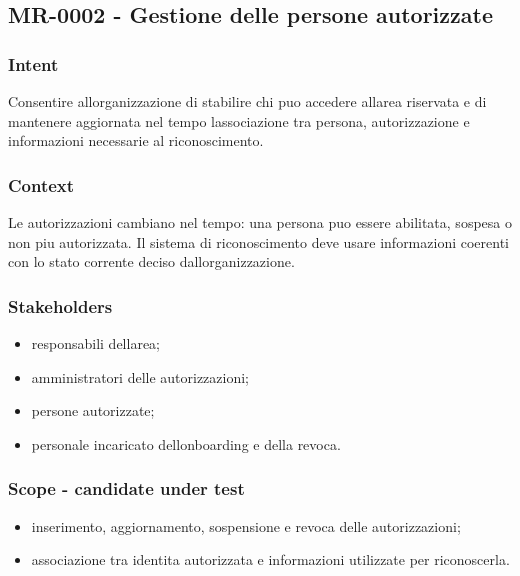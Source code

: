 \documentclass[
  10pt,
]{article}
\providecommand{\tightlist}{%
  \setlength{\itemsep}{0pt}\setlength{\parskip}{0pt}}
\begin{document}
\subsection{MR-0002 - Gestione delle persone
autorizzate}\label{mr-0002---gestione-delle-persone-autorizzate}

\subsubsection{Intent}\label{intent-1}

Consentire all\textquotesingle organizzazione di stabilire chi puo
accedere all\textquotesingle area riservata e di mantenere aggiornata
nel tempo l\textquotesingle associazione tra persona, autorizzazione e
informazioni necessarie al riconoscimento.

\subsubsection{Context}\label{context-1}

Le autorizzazioni cambiano nel tempo: una persona puo essere abilitata,
sospesa o non piu autorizzata. Il sistema di riconoscimento deve usare
informazioni coerenti con lo stato corrente deciso
dall\textquotesingle organizzazione.

\subsubsection{Stakeholders}\label{stakeholders-1}

\begin{itemize}
\tightlist
\item
  responsabili dell\textquotesingle area;
\item
  amministratori delle autorizzazioni;
\item
  persone autorizzate;
\item
  personale incaricato dell\textquotesingle onboarding e della revoca.
\end{itemize}

\subsubsection{Scope - candidate under
test}\label{scope---candidate-under-test-1}

\begin{itemize}
\tightlist
\item
  inserimento, aggiornamento, sospensione e revoca delle autorizzazioni;
\item
  associazione tra identita autorizzata e informazioni utilizzate per
  riconoscerla.
\end{itemize}
\end{document}
